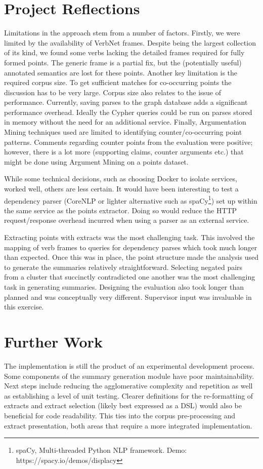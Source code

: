   \section{Project Reflections}
    Limitations in the approach stem from a number of factors. Firstly, we were limited by the availability of VerbNet frames. Despite being the largest collection of its kind, we found some verbs lacking the detailed frames required for fully formed points. The generic frame is a partial fix, but the (potentially useful) annotated semantics are lost for these points.
    Another key limitation is the required corpus size. To get sufficient matches for co-occurring points the discussion has to be very large. Corpus size also relates to the issue of performance. Currently, saving parses to the graph database adds a significant performance overhead. Ideally the Cypher queries could be run on parses stored in memory without the need for an additional service.
    Finally, Argumentation Mining techniques used are limited to identifying counter/co-occurring point patterns. Comments regarding counter points from the evaluation were positive; however, there is a lot more (supporting claims, counter arguments etc.) that might be done using Argument Mining on a points dataset.

    While some technical decisions, such as choosing Docker to isolate services, worked well, others are less certain. It would have been interesting to test a dependency parser (CoreNLP or lighter alternative such as spaCy\footnote{spaCy, Multi-threaded Python NLP framework. Demo: https://spacy.io/demos/displacy}) set up within the same service as the points extractor. Doing so would reduce the HTTP request/response overhead incurred when using a parser as an external service.

    Extracting points with extracts was the most challenging task. This involved the mapping of verb frames to queries for dependency parses which took much longer than expected. Once this was in place, the point structure made the analysis used to generate the summaries relatively straightforward. Selecting negated pairs from a cluster that succinctly contradicted one another was the most challenging task in generating summaries. Designing the evaluation also took longer than planned and was conceptually very different. Supervisor input was invaluable in this exercise.

  \section{Further Work}
    The implementation is still the product of an experimental development process. Some components of the summary generation module have poor maintainability. Next steps include reducing the agglomerative complexity and repetition as well as establishing a level of unit testing. Clearer definitions for the re-formatting of extracts and extract selection (likely best expressed as a DSL) would also be beneficial for code readability. This ties into the corpus pre-processing and extract presentation, both areas that require a more integrated implementation.

